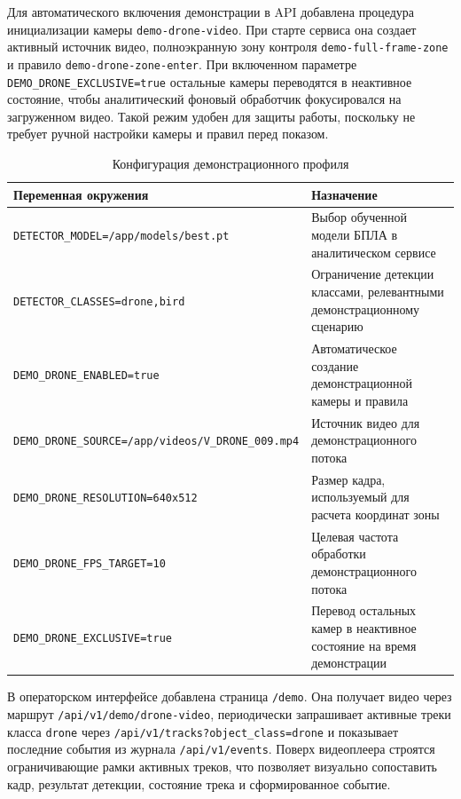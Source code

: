 Для автоматического включения демонстрации в API добавлена процедура инициализации камеры \texttt{demo-drone-video}. При старте сервиса она создает активный источник видео, полноэкранную зону контроля \texttt{demo-full-frame-zone} и правило \texttt{demo-drone-zone-enter}. При включенном параметре \texttt{DEMO\_DRONE\_EXCLUSIVE=true} остальные камеры переводятся в неактивное состояние, чтобы аналитический фоновый обработчик фокусировался на загруженном видео. Такой режим удобен для защиты работы, поскольку не требует ручной настройки камеры и правил перед показом.

\begin{table}[H]
\caption{Конфигурация демонстрационного профиля}
\label{tab:drone_demo_config}
\begin{tabularx}{\textwidth}{@{}>{\raggedright\arraybackslash}p{}X@{}}
\toprule
Переменная окружения & Назначение \\
\midrule
\nolinkurl{DETECTOR_MODEL=/app/models/best.pt} & Выбор обученной модели БПЛА в аналитическом сервисе \\
\nolinkurl{DETECTOR_CLASSES=drone,bird} & Ограничение детекции классами, релевантными демонстрационному сценарию \\
\nolinkurl{DEMO_DRONE_ENABLED=true} & Автоматическое создание демонстрационной камеры и правила \\
\nolinkurl{DEMO_DRONE_SOURCE=/app/videos/V_DRONE_009.mp4} & Источник видео для демонстрационного потока \\
\nolinkurl{DEMO_DRONE_RESOLUTION=640x512} & Размер кадра, используемый для расчета координат зоны \\
\nolinkurl{DEMO_DRONE_FPS_TARGET=10} & Целевая частота обработки демонстрационного потока \\
\nolinkurl{DEMO_DRONE_EXCLUSIVE=true} & Перевод остальных камер в неактивное состояние на время демонстрации \\
\bottomrule
\end{tabularx}
\end{table}

В операторском интерфейсе добавлена страница \texttt{/demo}. Она получает видео через маршрут \texttt{/api/v1/demo/drone-video}, периодически запрашивает активные треки класса \texttt{drone} через \texttt{/api/v1/tracks?object\_class=drone} и показывает последние события из журнала \texttt{/api/v1/events}. Поверх видеоплеера строятся ограничивающие рамки активных треков, что позволяет визуально сопоставить кадр, результат детекции, состояние трека и сформированное событие.

